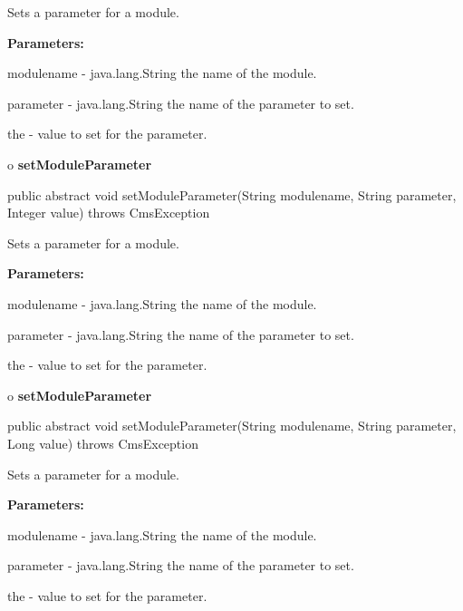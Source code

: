 \begin{description}
\htmlDD Sets a parameter for a module. 

\begin{description}
\item {\bf Parameters:}  

modulename - java.lang.String the name of the module.  

parameter - java.lang.String the name of the parameter to set.  

the - value to set for the parameter.  
\end{description}

\end{description}

o {\bf setModuleParameter} 

\begin{PRE}
 public abstract void setModuleParameter(String modulename,
                                         String parameter,
                                         Integer value) throws CmsException
\end{PRE}

\begin{description}
\htmlDD Sets a parameter for a module. 

\begin{description}
\item {\bf Parameters:}  

modulename - java.lang.String the name of the module.  

parameter - java.lang.String the name of the parameter to set.  

the - value to set for the parameter.  
\end{description}

\end{description}

o {\bf setModuleParameter} 

\begin{PRE}
 public abstract void setModuleParameter(String modulename,
                                         String parameter,
                                         Long value) throws CmsException
\end{PRE}

\begin{description}
\htmlDD Sets a parameter for a module. 

\begin{description}
\item {\bf Parameters:}  

modulename - java.lang.String the name of the module.  

parameter - java.lang.String the name of the parameter to set.  

the - value to set for the parameter.  
\end{description}

\end{description}

